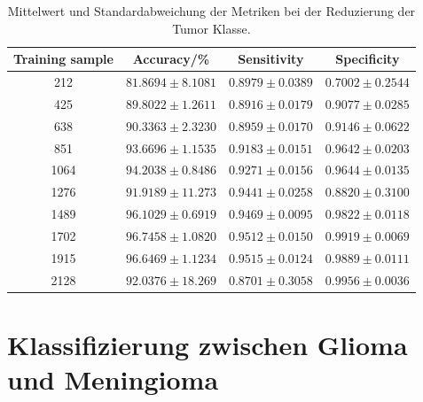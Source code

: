 \begin{table}[H]
    \centering
     {\small
        \begin{tabular}{cccc}
            \toprule
            Training sample & Accuracy/\% & Sensitivity & Specificity\\
            \midrule
            212  & $81.8694 \pm 8.1081$ & $0.8979 \pm 0.0389$ & $0.7002 \pm 0.2544$\\
            425  & $89.8022 \pm 1.2611$ & $0.8916 \pm 0.0179$ & $0.9077 \pm 0.0285$\\
            638  & $90.3363 \pm 2.3230$ & $0.8959 \pm 0.0170$ & $0.9146 \pm 0.0622$\\
            851  & $93.6696 \pm 1.1535$ & $0.9183 \pm 0.0151$ & $0.9642 \pm 0.0203$\\
            1064 & $94.2038 \pm 0.8486$ & $0.9271 \pm 0.0156$ & $0.9644 \pm 0.0135$\\
            1276 & $91.9189 \pm 11.273$ & $0.9441 \pm 0.0258$ & $0.8820 \pm 0.3100$\\
            1489 & $96.1029 \pm 0.6919$ & $0.9469 \pm 0.0095$ & $0.9822 \pm 0.0118$\\
            1702 & $96.7458 \pm 1.0820$ & $0.9512 \pm 0.0150$ & $0.9919 \pm 0.0069$\\
            1915 & $96.6469 \pm 1.1234$ & $0.9515 \pm 0.0124$ & $0.9889 \pm 0.0111$\\
            2128 & $92.0376 \pm 18.269$ & $0.8701 \pm 0.3058$ & $0.9956 \pm 0.0036$\\
            \bottomrule
        \end{tabular}}
  \caption{Mittelwert und Standardabweichung der Metriken bei der Reduzierung der Tumor Klasse.}
  \label{tab:red_tu}
\end{table}
\section{Klassifizierung zwischen Glioma und Meningioma}
